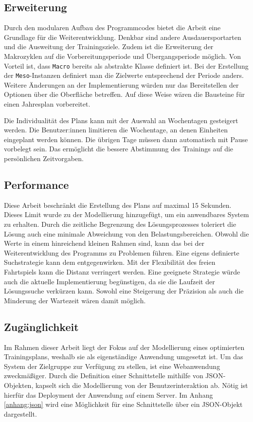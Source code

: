 \subsection{Erweiterung} 
Durch den modularen Aufbau des Programmcodes bietet die Arbeit eine Grundlage für die Weiterentwicklung. Denkbar sind andere Ausdauersportarten und die Ausweitung der Trainingsziele. Zudem ist die Erweiterung der Makrozyklen auf die Vorbereitungsperiode und Übergangsperiode möglich. Von Vorteil ist, dass \texttt{Macro} bereits als abstrakte Klasse definiert ist. Bei der Erstellung der \texttt{Meso}-Instanzen definiert man die Zielwerte entsprechend der Periode anders. Weitere Änderungen an der Implementierung würden nur das Bereitstellen der Optionen über die Oberfläche betreffen. Auf diese Weise wären die Bausteine für einen Jahresplan vorbereitet.\par
Die Individualität des Plans kann mit der Auswahl an Wochentagen gesteigert werden. Die Benutzer:innen limitieren die Wochentage, an denen Einheiten eingeplant werden können. Die übrigen Tage müssen dann automatisch mit Pause vorbelegt sein. Das ermöglicht die bessere Abstimmung des Trainings auf die persönlichen Zeitvorgaben.
    
\subsection{Performance}
Diese Arbeit beschränkt die Erstellung des Plans auf maximal 15 Sekunden. Dieses Limit wurde zu der Modellierung hinzugefügt, um ein anwendbares System zu erhalten. Durch die zeitliche Begrenzung des Lösungsprozesses toleriert die Lösung auch eine minimale Abweichung von den Belastungsbereichen. Obwohl die Werte in einem hinreichend kleinen Rahmen sind, kann das bei der Weiterentwicklung des Programms zu Problemen führen. \newline
Eine eigens definierte Suchstrategie kann dem entgegenwirken. Mit der Flexibilität des freien Fahrtspiels kann die Distanz verringert werden. Eine geeignete Strategie würde auch die aktuelle Implementierung begünstigen, da sie die Laufzeit der Lösungssuche verkürzen kann. Sowohl eine Steigerung der Präzision als auch die Minderung der Wartezeit wären damit möglich.

\subsection{Zugänglichkeit}
Im Rahmen dieser Arbeit liegt der Fokus auf der Modellierung eines optimierten Trainingsplans, weshalb sie als eigenständige Anwendung umgesetzt ist. Um das System der Zielgruppe zur Verfügung zu stellen, ist eine Webanwendung zweckmäßiger. 
Durch die Definition einer Schnittstelle mithilfe von JSON-Objekten, kapselt sich die Modellierung von der Benutzerinteraktion ab. Nötig ist hierfür das Deployment der Anwendung auf einem Server. Im Anhang \ref{anhang:json} wird eine Möglichkeit für eine Schnittstelle über ein JSON-Objekt dargestellt.
